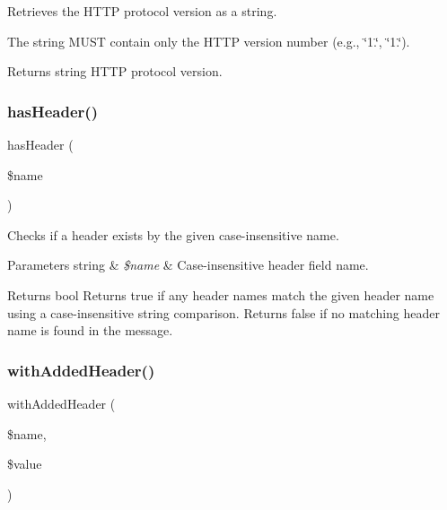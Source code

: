 Retrieves the H\+T\+TP protocol version as a string.

The string M\+U\+ST contain only the H\+T\+TP version number (e.\+g., \char`\"{}1.\char`\"{}, \char`\"{}1.\char`\"{}).

\begin{DoxyReturn}{Returns}
string H\+T\+TP protocol version. 
\end{DoxyReturn}
\mbox{\label{class_pes_1_1_http_1_1_message_ad506774d2e42c7e4ec4b5f05009889b4}} 
\subsubsection{\texorpdfstring{has\+Header()}{hasHeader()}}
{\footnotesize\ttfamily has\+Header (\begin{DoxyParamCaption}\item[{}]{\$name }\end{DoxyParamCaption})}

Checks if a header exists by the given case-\/insensitive name.


\begin{DoxyParams}[1]{Parameters}
string & {\em \$name} & Case-\/insensitive header field name. \\
\hline
\end{DoxyParams}
\begin{DoxyReturn}{Returns}
bool Returns true if any header names match the given header name using a case-\/insensitive string comparison. Returns false if no matching header name is found in the message. 
\end{DoxyReturn}
\mbox{\label{class_pes_1_1_http_1_1_message_a05ad08277c49a818e9c1a6ef4d613683}} 
\subsubsection{\texorpdfstring{with\+Added\+Header()}{withAddedHeader()}}
{\footnotesize\ttfamily with\+Added\+Header (\begin{DoxyParamCaption}\item[{}]{\$name,  }\item[{}]{\$value }\end{DoxyParamCaption})}

